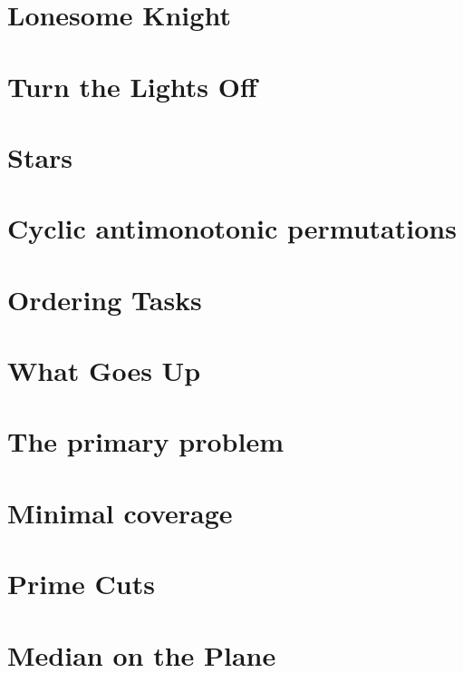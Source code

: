 \newpage
\section{Lonesome Knight}


\newpage
\section{Turn the Lights Off}


\newpage
\section{Stars}


\newpage
\section{Cyclic antimonotonic permutations}


\newpage
\section{Ordering Tasks}


\newpage
\section{What Goes Up}


\newpage
\section{The primary problem}


\newpage
\section{Minimal coverage}


\newpage
\section{Prime Cuts}


\newpage
\section{Median on the Plane}


